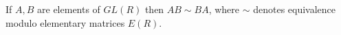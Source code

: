 If $A, B$ are elements of $GL(R)$ then $AB \sim BA$, where $\sim$ denotes equivalence modulo elementary matrices $E(R)$.
